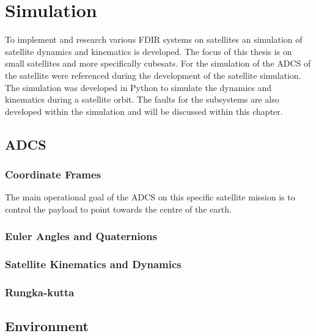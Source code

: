\chapter{Simulation}
\vspace{-2em}
\minitoc
To implement and research various FDIR systems on satellites an simulation of satellite dynamics and kinematics is developed. The focus of this thesis is on small satellites and more specifically cubesats. For the simulation of the ADCS of the satellite \cite{auret2012design, JansevanVuuren2015, Jordaan2016} were referenced during the development of the satellite simulation. The simulation was developed in Python to simulate the dynamics and kinematics during a satellite orbit. The faults for the subsystems are also developed within the simulation and will be discussed within this chapter.

\section{ADCS}

\subsection{Coordinate Frames}


The main operational goal of the ADCS on this specific satellite mission is to control the payload to point towards the centre of the earth. 

\subsection{Euler Angles and Quaternions}

\subsection{Satellite Kinematics and Dynamics}

\subsection{Rungka-kutta}

\section{Environment}
